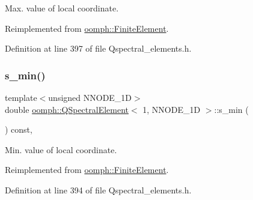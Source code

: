 Max. value of local coordinate. 



Reimplemented from \hyperlink{classoomph_1_1FiniteElement_a64adbe9356927133686ab53f00341ea8}{oomph\+::\+Finite\+Element}.



Definition at line 397 of file Qspectral\+\_\+elements.\+h.

\mbox{\label{classoomph_1_1QSpectralElement_3_011_00_01NNODE__1D_01_4_a32d567a3c558e28710aed1e8fd83c4ae}} 
\subsubsection{\texorpdfstring{s\+\_\+min()}{s\_min()}}
{\footnotesize\ttfamily template$<$unsigned N\+N\+O\+D\+E\+\_\+1D$>$ \\
double \hyperlink{classoomph_1_1QSpectralElement}{oomph\+::\+Q\+Spectral\+Element}$<$ 1, N\+N\+O\+D\+E\+\_\+1D $>$\+::s\+\_\+min (\begin{DoxyParamCaption}{ }\end{DoxyParamCaption}) const\hspace{0.3cm}{\ttfamily [inline]}, {\ttfamily [virtual]}}



Min. value of local coordinate. 



Reimplemented from \hyperlink{classoomph_1_1FiniteElement_a35f0803115b68bd162c07de04eeb6c5c}{oomph\+::\+Finite\+Element}.



Definition at line 394 of file Qspectral\+\_\+elements.\+h.

\mbox{\label{classoomph_1_1QSpectralElement_3_011_00_01NNODE__1D_01_4_a20a70f397d718449bcb16e6e60ea74a1}} 
